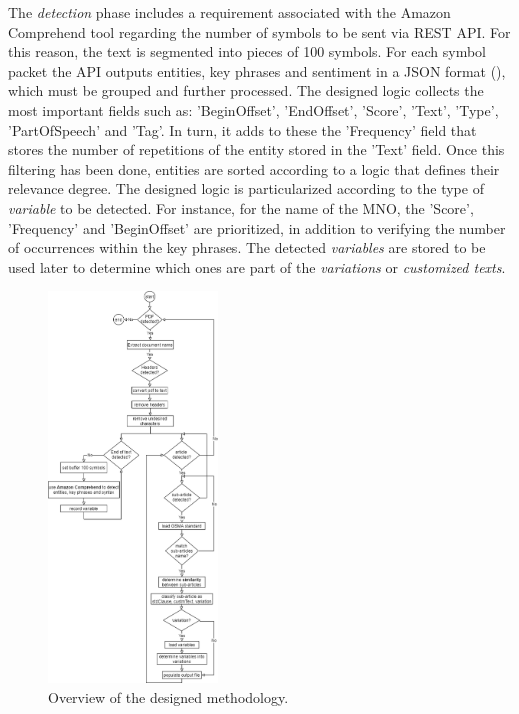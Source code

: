 \documentclass[conference]{style/IEEEtran}
\begin{document}
The \textit{detection} phase includes a requirement associated with the Amazon Comprehend tool regarding the number of symbols to be sent via REST API. For this reason, the text is segmented into pieces of 100 symbols. For each symbol packet the API outputs entities, key phrases and sentiment in a JSON format (\cite{AWS2021}), which must be grouped and further processed. The designed logic collects the most important fields such as: 'BeginOffset', 'EndOffset', 'Score', 'Text', 'Type', 'PartOfSpeech' and 'Tag'. In turn, it adds to these the 'Frequency' field that stores the number of repetitions of the entity stored in the 'Text' field. Once this filtering has been done, entities are sorted according to a logic that defines their relevance degree. The designed logic is particularized according to the type of \textit{variable} to be detected. For instance, for the name of the MNO, the 'Score', 'Frequency' and 'BeginOffset' are prioritized, in addition to verifying the number of occurrences within the key phrases. The detected \textit{variables} are stored to be used later to determine which ones are part of the \textit{variations} or \textit{customized texts}.

\begin{figure}[htbp]
\centerline{\includegraphics[width=0.4\textwidth]{images/methodology.png}}
\caption{Overview of the designed methodology.}
\label{fig1}
\end{figure}
\end{document}
